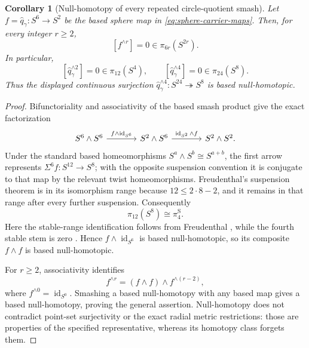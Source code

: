 \documentclass[11pt,letterpaper]{article}
\numberwithin{equation}{section}
\newtheorem{corollary}[theorem]{Corollary}
\theoremstyle{definition}
\theoremstyle{remark}
\begin{document}
\begin{corollary}[Null-homotopy of every repeated circle-quotient smash]
\label{cor:full-S24-map-null}
Let \(f=\widehat q_\gamma:S^6\to S^2\) be the based sphere map in
\cref{eq:sphere-carrier-maps}.  Then, for every integer \(r\geq2\),
\[
 [f^{\wedge r}]=0\in\pi_{6r}(S^{2r}).
\]
In particular,
\[
 [\widehat q_\gamma^{\wedge2}]
 =0\in\pi_{12}(S^4),
 \qquad
 [\widehat q_\gamma^{\wedge4}]
 =0\in\pi_{24}(S^8).
\]
Thus the displayed continuous surjection
\(\widehat q_\gamma^{\wedge4}:S^{24}\twoheadrightarrow S^8\) is based
null-homotopic.
\end{corollary}

\begin{proof}
Bifunctoriality and associativity of the based smash product give the exact
factorization
\[
\begin{tikzcd}[column sep=large]
 S^6\wedge S^6
 \arrow[r,"f\wedge\operatorname{id}_{S^6}"]&
 S^2\wedge S^6
 \arrow[r,"\operatorname{id}_{S^2}\wedge f"]&
 S^2\wedge S^2 .
\end{tikzcd}
\]
Under the standard based homeomorphisms
\(S^a\wedge S^b\cong S^{a+b}\), the first arrow represents
\(\Sigma^6f:S^{12}\to S^8\); with the opposite suspension convention it
is conjugate to that map by the relevant twist homeomorphisms.  Freudenthal's
suspension theorem is in its isomorphism range because
\(12\leq2\cdot8-2\), and it remains in that range after every further
suspension.  Consequently
\[
 \pi_{12}(S^8)\cong\pi_4^{\mathrm S}.
\]
Here the stable-range identification follows from Freudenthal
\citep[Corollary~4.24, p.~360]{Hatcher2002}, while the fourth stable stem
is zero \citep[Table~1, p.~113]{IsaksenWangXu2023}.  Hence
\(f\wedge\operatorname{id}_{S^6}\) is based null-homotopic, so its
composite \(f\wedge f\) is based null-homotopic.

For \(r\geq2\), associativity identifies
\[
 f^{\wedge r}=(f\wedge f)\wedge f^{\wedge(r-2)},
\]
where \(f^{\wedge0}=\operatorname{id}_{S^0}\).  Smashing a based
null-homotopy with any based map gives a based null-homotopy, proving the
general assertion.  Null-homotopy does not contradict point-set
surjectivity or the exact radial metric restrictions: those are properties
of the specified representative, whereas its homotopy class forgets them.
\end{proof}
\end{document}
